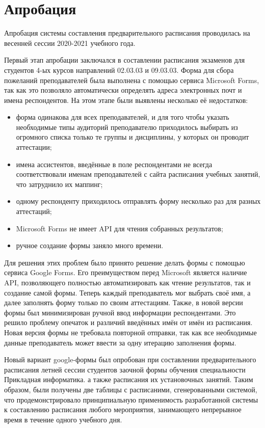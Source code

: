 \section{Апробация} \label{ch4:sec4}
Апробация системы составления предварительного расписания проводилась на весенней сессии 2020-2021 учебного года. 

Первый этап апробации заключался в составлении расписания экзаменов для студентов 4-ых курсов направлений 02.03.03 и 09.03.03. Форма для сбора пожеланий преподавателей была выполнена с помощью сервиса Microsoft Forms, так как это позволяло автоматически определять адреса электронных почт и имена респондентов. На этом этапе были выявлены несколько её недостатков:

\begin{itemize}
\item форма одинакова для всех преподавателей, и для того чтобы указать необходимые типы аудиторий преподавателю приходилось выбирать из огромного списка только те группы и дисциплины, у которых он проводит аттестации;
\item имена ассистентов, введённые в поле респондентами не всегда соответствовали именам преподавателей с сайта расписания учебных занятий, что затруднило их маппинг;
\item одному респонденту приходилось отправлять форму несколько раз для разных аттестаций;
\item Microsoft Forms не имеет API для чтения собранных результатов;
\item ручное создание формы заняло много времени.
\end{itemize} 	

Для решения этих проблем было принято решение делать формы с помощью сервиса Google Forms. Его преимуществом перед Microsoft является наличие API, позволяющего полностью автоматизировать как чтение результатов, так и создание самой формы. Теперь каждый преподаватель мог выбрать своё имя, а далее заполнять форму только по своим аттестациям. Также, в новой версии формы был минимизирован ручной ввод информации респондентами. Это решило проблему опечаток и различий введённых имён от имён из расписания. Новая версия формы не требовала повторной отправки, так как все необходимые данные преподаватель может ввести за одну итерацию заполнения формы.

Новый вариант google-формы был опробован при составлении предварительного расписания летней сессии студентов заочной формы обучения специальности Прикладная информатика. 
а также расписания их установочных занятий. Таким образом, были получены две таблицы с расписаними, сгенерованными системой, что продемонстрировало принципиальную применимость разработанной системы к составлению расписания любого мероприятия, занимающего непрерывное время в течение одного учебного дня. 


